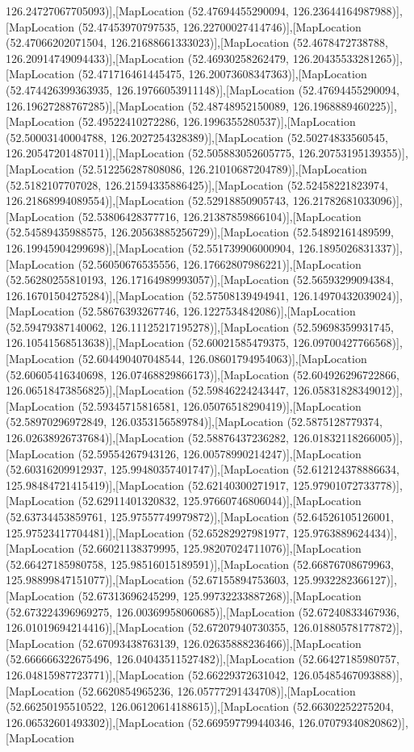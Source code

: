 126.24727067705093)],[MapLocation (52.47694455290094, 126.23644164987988)],[MapLocation (52.47453970797535, 126.22700027414746)],[MapLocation (52.47066202071504, 126.21688661333023)],[MapLocation (52.4678472738788, 126.20914749094433)],[MapLocation (52.46930258262479, 126.20435533281265)],[MapLocation (52.471716461445475, 126.20073608347363)],[MapLocation (52.474426399363935, 126.19766053911148)],[MapLocation (52.47694455290094, 126.19627288767285)],[MapLocation (52.48748952150089, 126.1968889460225)],[MapLocation (52.49522410272286, 126.1996355280537)],[MapLocation (52.50003140004788, 126.2027254328389)],[MapLocation (52.50274833560545, 126.20547201487011)],[MapLocation (52.505883052605775, 126.20753195139355)],[MapLocation (52.512256287808086, 126.21010687204789)],[MapLocation (52.5182107707028, 126.21594335886425)],[MapLocation (52.52458221823974, 126.21868994089554)],[MapLocation (52.52918850905743, 126.21782681033096)],[MapLocation (52.53806428377716, 126.21387859866104)],[MapLocation (52.54589435988575, 126.20563885256729)],[MapLocation (52.54892161489599, 126.19945904299698)],[MapLocation (52.551739906000904, 126.1895026831337)],[MapLocation (52.56050676535556, 126.17662807986221)],[MapLocation (52.56280255810193, 126.17164989993057)],[MapLocation (52.56593299094384, 126.16701504275284)],[MapLocation (52.57508139494941, 126.14970432039024)],[MapLocation (52.58676393267746, 126.1227534842086)],[MapLocation (52.59479387140062, 126.11125217195278)],[MapLocation (52.59698359931745, 126.10541568513638)],[MapLocation (52.60021585479375, 126.09700427766568)],[MapLocation (52.604490407048544, 126.08601794954063)],[MapLocation (52.60605416340698, 126.07468829866173)],[MapLocation (52.604926296722866, 126.06518473856825)],[MapLocation (52.59846224243447, 126.05831828349012)],[MapLocation (52.59345715816581, 126.05076518290419)],[MapLocation (52.58970296972849, 126.0353156589784)],[MapLocation (52.5875128779374, 126.02638926737684)],[MapLocation (52.58876437236282, 126.01832118266005)],[MapLocation (52.59554267943126, 126.00578990214247)],[MapLocation (52.60316209912937, 125.99480357401747)],[MapLocation (52.612124378886634, 125.98484721415419)],[MapLocation (52.62140300271917, 125.97901072733778)],[MapLocation (52.62911401320832, 125.97660746806044)],[MapLocation (52.63734453859761, 125.97557749979872)],[MapLocation (52.64526105126001, 125.97523417704481)],[MapLocation (52.65282927981977, 125.9763889624434)],[MapLocation (52.66021138379995, 125.98207024711076)],[MapLocation (52.66427185980758, 125.98516015189591)],[MapLocation (52.66876708679963, 125.98899847151077)],[MapLocation (52.67155894753603, 125.9932282366127)],[MapLocation (52.67313696245299, 125.99732233887268)],[MapLocation (52.673224396969275, 126.00369958060685)],[MapLocation (52.67240833467936, 126.01019694214416)],[MapLocation (52.67207940730355, 126.01880578177872)],[MapLocation (52.67093438763139, 126.02635888236466)],[MapLocation (52.666666322675496, 126.04043511527482)],[MapLocation (52.66427185980757, 126.04815987723771)],[MapLocation (52.66229372631042, 126.05485467093888)],[MapLocation (52.6620854965236, 126.05777291434708)],[MapLocation (52.66250195510522, 126.06120614188615)],[MapLocation (52.66302252275204, 126.06532601493302)],[MapLocation (52.669597799440346, 126.07079340820862)],[MapLocation 